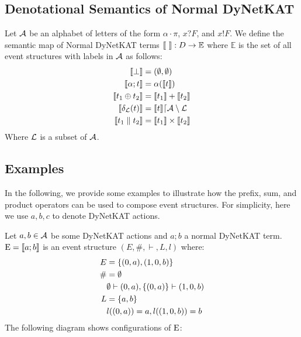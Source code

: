 \subsection{Denotational Semantics of Normal DyNetKAT}

\begin{definition}
    Let $\mathcal{A}$ be an alphabet of letters of the form
    $\alpha \cdot \pi$,
    $x?F$, and $x!F$.
    We define the semantic map of Normal DyNetKAT terms
    $\llbracket  \  \rrbracket: D \rightarrow \mathbb{E}$ where
    $\mathbb{E}$ is the set of all event structures with
    labels in $\mathcal{A}$ as follows:
    \begin{align*}
        \llbracket \bot \rrbracket      & = (\emptyset,\emptyset)                  \\
        \llbracket \alpha; t \rrbracket & = \alpha(\llbracket t \rrbracket)                        \\
        \llbracket t_1 \oplus t_2 \rrbracket
                        & = \llbracket t_1 \rrbracket + \llbracket t_2 \rrbracket                  \\
        \llbracket \delta_{\mathcal{L}}(t) \rrbracket
                        & = \llbracket t \rrbracket \lceil \mathcal{A} \setminus \mathcal{L} \\
        \llbracket t_1 \parallel t_2 \rrbracket
                        & = \llbracket t_1 \rrbracket \times \llbracket t_2 \rrbracket
    \end{align*}
    Where $\mathcal{L}$ is a subset of $\mathcal{A}$.
\end{definition}

\subsection{Examples}
In the following, we provide some examples to illustrate
how the prefix, sum, and product operators can be used to 
compose event structures.
For simplicity, here we use $a,b,c$ to denote DyNetKAT actions.

\begin{example}
    Let $a,b\in \mathcal{A}$ be some DyNetKAT actions and $a;b$ a
    normal DyNetKAT term.
    $\mathrm{E} = \llbracket a;b \rrbracket$ is an event structure
    $(E,\#,\vdash,L,l)$ where:
    \begin{align*}
        E  & = \{(0,a),(1,0,b)\}                       \\
        \# & = \emptyset                               \\
           & \emptyset \vdash (0,a), \{(0,a)\} \vdash (1,0,b) \\
        L  & = \{a,b\}                                 \\
           & l((0,a)) = a, l((1,0,b)) = b              
    \end{align*}
    The following diagram shows configurations of $\mathrm{E}$:
    \begin{center}
    \end{center}
\end{example}

